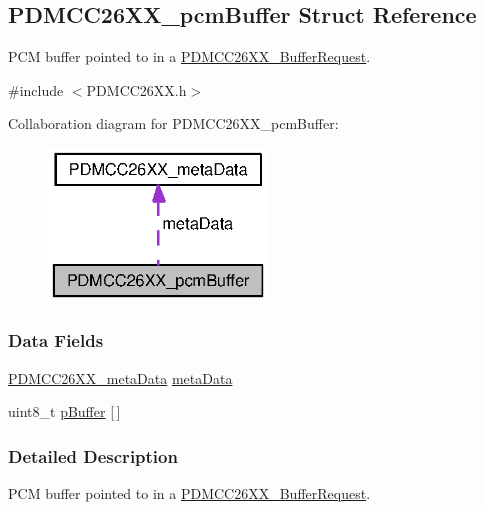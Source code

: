 \subsection{P\+D\+M\+C\+C26\+X\+X\+\_\+pcm\+Buffer Struct Reference}
\label{struct_p_d_m_c_c26_x_x__pcm_buffer}


P\+C\+M buffer pointed to in a \hyperlink{struct_p_d_m_c_c26_x_x___buffer_request}{P\+D\+M\+C\+C26\+X\+X\+\_\+\+Buffer\+Request}.  




{\ttfamily \#include $<$P\+D\+M\+C\+C26\+X\+X.\+h$>$}



Collaboration diagram for P\+D\+M\+C\+C26\+X\+X\+\_\+pcm\+Buffer\+:
\nopagebreak
\begin{figure}[H]
\begin{center}
\leavevmode
\includegraphics[width=165pt]{struct_p_d_m_c_c26_x_x__pcm_buffer__coll__graph}
\end{center}
\end{figure}
\subsubsection*{Data Fields}
\begin{DoxyCompactItemize}
\item 
\hyperlink{struct_p_d_m_c_c26_x_x__meta_data}{P\+D\+M\+C\+C26\+X\+X\+\_\+meta\+Data} \hyperlink{struct_p_d_m_c_c26_x_x__pcm_buffer_ac652edcb2ef46127630cc5c765bccee0}{meta\+Data}
\item 
uint8\+\_\+t \hyperlink{struct_p_d_m_c_c26_x_x__pcm_buffer_abdff62b23b9567ca243328c5350b0ea9}{p\+Buffer} \mbox{[}$\,$\mbox{]}
\end{DoxyCompactItemize}


\subsubsection{Detailed Description}
P\+C\+M buffer pointed to in a \hyperlink{struct_p_d_m_c_c26_x_x___buffer_request}{P\+D\+M\+C\+C26\+X\+X\+\_\+\+Buffer\+Request}. 

